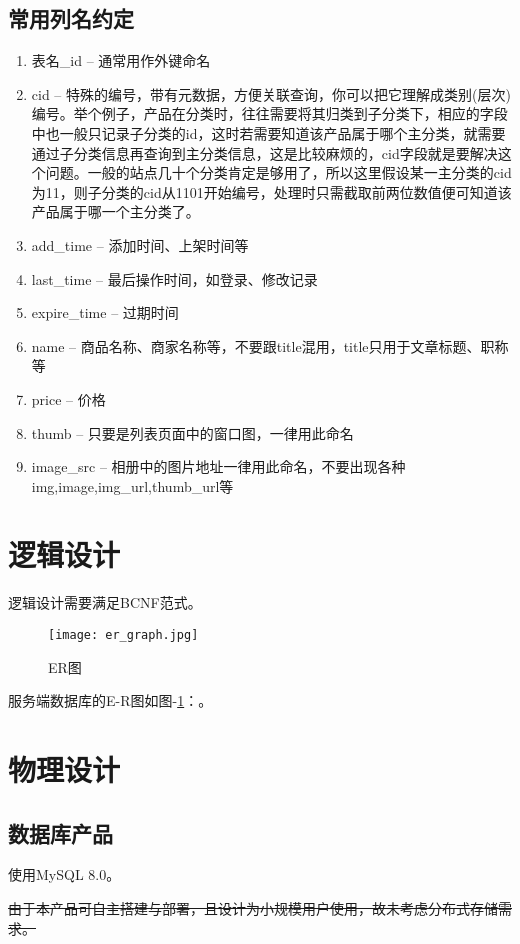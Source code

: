 \subsection{常用列名约定}
\begin{enumerate}
    \item 表名\_id – 通常用作外键命名
    \item cid – 特殊的编号，带有元数据，方便关联查询，你可以把它理解成类别(层次)编号。举个例子，产品在分类时，往往需要将其归类到子分类下，相应的字段中也一般只记录子分类的id，这时若需要知道该产品属于哪个主分类，就需要通过子分类信息再查询到主分类信息，这是比较麻烦的，cid字段就是要解决这个问题。一般的站点几十个分类肯定是够用了，所以这里假设某一主分类的cid为11，则子分类的cid从1101开始编号，处理时只需截取前两位数值便可知道该产品属于哪一个主分类了。
    \item add\_time – 添加时间、上架时间等
    \item last\_time – 最后操作时间，如登录、修改记录
    \item expire\_time – 过期时间
    \item name – 商品名称、商家名称等，不要跟title混用，title只用于文章标题、职称等
    \item price – 价格
    \item thumb – 只要是列表页面中的窗口图，一律用此命名
    \item image\_src – 相册中的图片地址一律用此命名，不要出现各种img,image,img\_url,thumb\_url等
\end{enumerate}

\section{逻辑设计}
逻辑设计需要满足BCNF范式。
\begin{figure}[h]
	\centering
	\texttt{[image: er\_graph.jpg]}
	\caption{ER图} \label{fig:er_graph}
\end{figure}
服务端数据库的E-R图如图-\ref{fig:er_graph}：。

\section{物理设计}
\subsection{数据库产品}
使用MySQL 8.0。{\color{red} \sout{由于本产品可自主搭建与部署，且设计为小规模用户使用，故未考虑分布式存储需求。}\par}

